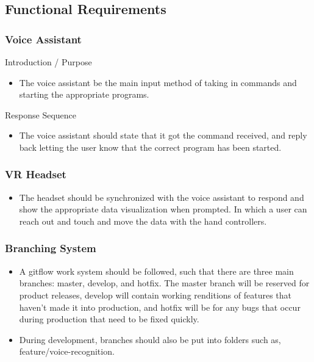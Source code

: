 \documentclass[onecolumn, draftclsnofoot,10pt, compsoc]{IEEEtran}
\begin{document}
    \subsection{Functional Requirements}

        \subsubsection{Voice Assistant}
            Introduction / Purpose
            \begin{itemize}
                \item The voice assistant be the main input method of taking in commands and starting the appropriate programs.
            \end{itemize}
            Response Sequence
            \begin{itemize}
                \item The voice assistant should state that it got the command received, and reply back letting the user know that the correct program has been started.
            \end{itemize}

        \subsubsection{VR Headset}
            \begin{itemize}
                    \item The headset should be synchronized with the voice assistant to respond and show the appropriate data visualization when prompted. In which a user can reach out and touch and move the data with the hand controllers.
            \end{itemize}
        \subsubsection{Branching System}
            \begin{itemize}
            \item A gitflow work system should be followed, such that there are three main branches: master, develop, and hotfix. The master branch will be reserved for product releases, develop will contain working renditions of features that haven't made it into production, and hotfix will be for any bugs that occur during production that need to be fixed quickly.

            \item During development, branches should also be put into     folders such as, feature/voice-recognition.
            \end{itemize}
\end{document}
